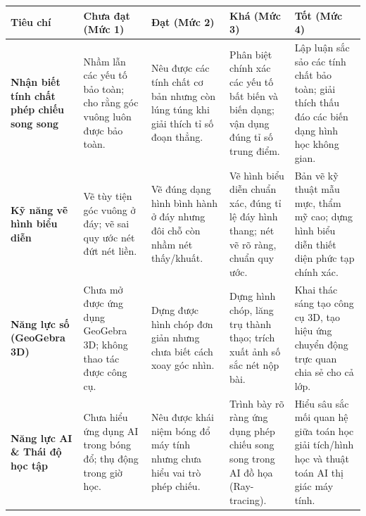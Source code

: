 \documentclass[12pt, a4paper]{article}
\begin{document}
\begin{center}
\small
\begin{tabularx}{\textwidth}{|p{2.8cm}|X|X|X|X|}
\hline
\textbf{Tiêu chí} & \textbf{Chưa đạt (Mức 1)} & \textbf{Đạt (Mức 2)} & \textbf{Khá (Mức 3)} & \textbf{Tốt (Mức 4)} \\ \hline
\textbf{Nhận biết tính chất phép chiếu song song} & Nhầm lẫn các yếu tố bảo toàn; cho rằng góc vuông luôn được bảo toàn. & Nêu được các tính chất cơ bản nhưng còn lúng túng khi giải thích tỉ số đoạn thẳng. & Phân biệt chính xác các yếu tố bất biến và biến dạng; vận dụng đúng tỉ số trung điểm. & Lập luận sắc sảo các tính chất bảo toàn; giải thích thấu đáo các biến dạng hình học không gian. \\ \hline
\textbf{Kỹ năng vẽ hình biểu diễn} & Vẽ tùy tiện góc vuông ở đáy; vẽ sai quy ước nét đứt nét liền. & Vẽ đúng dạng hình bình hành ở đáy nhưng đôi chỗ còn nhầm nét thấy/khuất. & Vẽ hình biểu diễn chuẩn xác, đúng tỉ lệ đáy hình thang; nét vẽ rõ ràng, chuẩn quy ước. & Bản vẽ kỹ thuật mẫu mực, thẩm mỹ cao; dựng hình biểu diễn thiết diện phức tạp chính xác. \\ \hline
\textbf{Năng lực số (GeoGebra 3D)} & Chưa mở được ứng dụng GeoGebra 3D; không thao tác được công cụ. & Dựng được hình chóp đơn giản nhưng chưa biết cách xoay góc nhìn. & Dựng hình chóp, lăng trụ thành thạo; trích xuất ảnh số sắc nét nộp bài. & Khai thác sáng tạo công cụ 3D, tạo hiệu ứng chuyển động trực quan chia sẻ cho cả lớp. \\ \hline
\textbf{Năng lực AI \& Thái độ học tập} & Chưa hiểu ứng dụng AI trong bóng đổ; thụ động trong giờ học. & Nêu được khái niệm bóng đổ máy tính nhưng chưa hiểu vai trò phép chiếu. & Trình bày rõ ràng ứng dụng phép chiếu song song trong AI đồ họa (Ray-tracing). & Hiểu sâu sắc mối quan hệ giữa toán học giải tích/hình học và thuật toán AI thị giác máy tính. \\ \hline
\end{tabularx}
\end{center}
\end{document}
